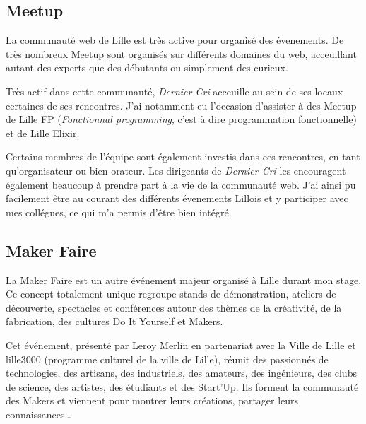 \subsection{Meetup}\label{meetup}

\bigskip

La communauté web de Lille est très active pour organisé des évenements.
De très nombreux Meetup sont organisés sur différents domaines du web,
acceuillant autant des experts que des débutants ou simplement des
curieux.

\bigskip

Très actif dans cette communauté, \emph{Dernier Cri} acceuille au sein
de ses locaux certaines de ses rencontres. J'ai notamment eu l'occasion
d'assister à des Meetup de Lille FP (\emph{Fonctionnal programming},
c'est à dire programmation fonctionnelle) et de Lille Elixir.

\bigskip

Certains membres de l'équipe sont également investis dans ces
rencontres, en tant qu'organisateur ou bien orateur. Les dirigeants de
\emph{Dernier Cri} les encouragent également beaucoup à prendre part à
la vie de la communauté web. J'ai ainsi pu facilement être au courant
des différents évenements Lillois et y participer avec mes collégues, ce
qui m'a permis d'être bien intégré.

\bigskip

\subsection{Maker Faire}\label{maker-faire}

\bigskip

La Maker Faire est un autre événement majeur organisé à Lille durant mon
stage. Ce concept totalement unique regroupe stands de démonstration,
ateliers de découverte, spectacles et conférences autour des thèmes de
la créativité, de la fabrication, des cultures Do It Yourself et Makers.

\bigskip

Cet événement, présenté par Leroy Merlin en partenariat avec la Ville de
Lille et lille3000 (programme culturel de la ville de Lille), réunit des
passionnés de technologies, des artisans, des industriels, des amateurs,
des ingénieurs, des clubs de science, des artistes, des étudiants et des
Start'Up. Ils forment la communauté des Makers et viennent pour montrer
leurs créations, partager leurs connaissances\ldots{}

\bigskip

